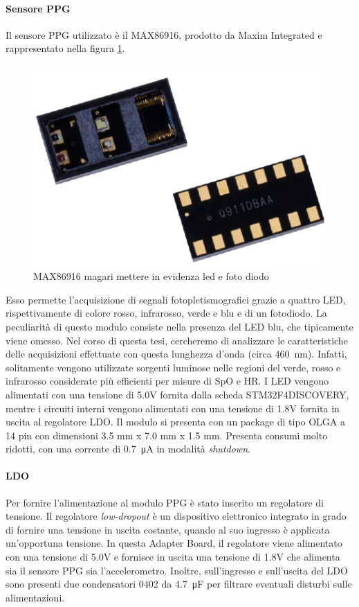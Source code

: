 \paragraph{Sensore PPG} Il sensore PPG utilizzato è il MAX86916, prodotto da Maxim Integrated e rappresentato nella figura \ref{fig:ImmagineMAX86916}.
\begin{figure}[b]
	\centering
	\includegraphics[width=0.6\linewidth]{ImageFiles/Hardware/ImmagineMAX86916}
	\caption{MAX86916 magari mettere in evidenza led e foto diodo}
	\label{fig:ImmagineMAX86916}
\end{figure}
Esso permette l'acquisizione di segnali fotopletismografici grazie a quattro LED, rispettivamente di colore rosso, infrarosso, verde e blu e di un fotodiodo. La peculiarità di questo modulo consiste nella presenza del LED blu, che tipicamente viene omesso. Nel corso di questa tesi, cercheremo di analizzare le caratteristiche delle acquisizioni effettuate con questa lunghezza d'onda (circa \SI{460}{\nano\meter}). Infatti, solitamente vengono utilizzate sorgenti luminose nelle regioni del verde, rosso e infrarosso considerate più efficienti per misure di SpO e HR. I LED vengono alimentati con una tensione di 5.0V  fornita dalla scheda STM32F4DISCOVERY, mentre i circuiti interni vengono alimentati con una tensione di 1.8V fornita in uscita al regolatore LDO. Il modulo si presenta con un package di tipo OLGA a 14 pin con dimensioni 3.5 mm x 7.0 mm x 1.5 mm. Presenta consumi molto ridotti, con una corrente di \SI{0.7}{\micro\ampere} in modalità \textit{shutdown}.

\paragraph{LDO} Per fornire l'alimentazione al modulo PPG è stato inserito un regolatore di tensione. Il regolatore \textit{low-dropout} è un dispositivo elettronico integrato in grado di fornire una tensione in uscita costante, quando al suo ingresso è applicata un'opportuna tensione\cite{Horowitz2015}. In questa Adapter Board, il regolatore viene alimentato con una tensione di 5.0V e fornisce in uscita una tensione di 1.8V che alimenta sia il sensore PPG sia l'accelerometro. Inoltre, sull'ingresso e sull'uscita del LDO sono presenti due condensatori 0402 da \SI{4.7}{\micro\farad} per filtrare eventuali disturbi sulle alimentazioni.

